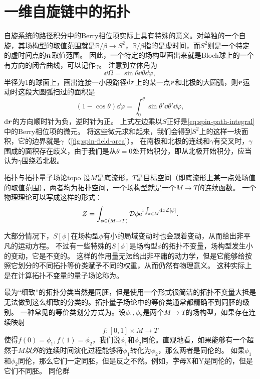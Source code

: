 \chapter{一维自旋链中的拓扑}



自旋系统的路径积分中的Berry相位项实际上具有特殊的意义。对单独的一个自旋，其场构型的取值范围就是$\mathbb{R} / \beta \rightarrow S^2$，$\mathbb{R} / \beta$指的是虚时间，而$S^2$则是一个特定的虚时间点的$\vb*{n}$取值范围。
因此，一个特定的场构型画出来就是Bloch球上的一个有方向的闭合曲线，可以记作$\gamma$。
注意到立体角为
\[
    \dd{\Omega} = \sin \theta \dd{\theta} \dd{\varphi},
\]
半径为1的球面上，画出连接一小段路径$\dd{\vb*{r}}$上的某一点$\vb*{r}$和北极的大圆弧，则$\vb*{r}$运动时这段大圆弧扫过的面积是
\[
    (1 - \cos \theta) \dd{\varphi} = \int_0^\theta \sin \theta' \dd{\theta'} \dd{\varphi},
\]
$\dd{\vb*{r}}$的方向顺时针为负，逆时针为正。
上式左边乘以$S$正好是\eqref{eq:spin-path-integral}中的Berry相位项的微元。
将这些微元求和起来，我们会得到$S^2$上的这样一块面积，它的边界就是$\gamma$（\autoref{fig:spin-field-area}）。
在南极和北极的连线和$\gamma$有交叉时，$\gamma$围成的面积存在歧义，由于我们是从$\theta=0$处开始积分，即从北极开始积分，应当认为$\gamma$围绕着北极。

\begin{back}{拓扑与拓扑量子场论}{topo}
    设$M$是底流形，$T$是目标空间（即底流形上某一点处场值的取值范围），两者均为拓扑空间，一个场构型就是一个$M \to T$的连续函数。
    一个物理理论可以写成这样的形式：
    \[
        Z = \int_{\phi \in (M \to T)} \mathcal{D} \phi \mathrm{e}^{\mathrm{i} \int_{x \in M} \dd{x} \mathcal{L}[\phi]}.
    \]

    大部分情况下，$S[\phi]$在场构型$\phi$有小的局域变动时也会跟着变动，从而给出非平凡的运动方程。
    不过有一些特殊的$S[\phi]$是场构型$\phi$的拓扑不变量，场构型发生小的变动，它是不变的。
    这样的作用量无法给出非平庸的动力学，但是它能够给按照它划分的不同拓扑等价类赋予不同的权重，从而仍然有物理意义。
    这种实际上是在计算拓扑不变量的量子场论称为。

    最为“细致”的拓扑分类当然是同胚，但是使用一个形式很简洁的拓扑不变量大抵是无法做到这么细致的分类的。拓扑量子场论中的等价类通常都精确不到同胚的级别。
    一种常见的等价类划分方式为。设$\phi_1, \phi_2$是两个$M \to T$的场构型，如果存在连续映射
    \[
        f: [0, 1] \times M \to T
    \]
    使得$f(0) = \phi_1, f(1) = \phi_2$，我们说$\phi_1$和$\phi_2$同伦。直观地看，如果能够有一个超然于$M$\emph{以外}的连续时间演化过程能够将$\phi_1$转化为$\phi_2$，那么两者是同伦的。
    如果$\phi_1$和$\phi_2$同伦，那么它们一定同胚，但是反之不然。例如，字母X和Y是同伦的，但是它们不同胚。
    同伦群
\end{back}


